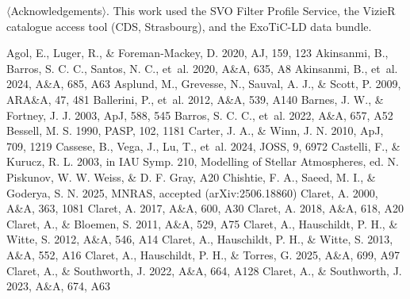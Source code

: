 \documentclass{aa}
\begin{document}
\begin{acknowledgements}
$\langle$Acknowledgements$\rangle$. This work used the SVO Filter Profile
Service, the VizieR catalogue access tool (CDS, Strasbourg), and the ExoTiC-LD
data bundle.
\end{acknowledgements}


\begin{thebibliography}{}
 Agol, E., Luger, R., \& Foreman-Mackey, D. 2020, AJ, 159, 123
 Akinsanmi, B., Barros, S. C. C., Santos, N. C., et~al. 2020, A\&A, 635, A8
 Akinsanmi, B., et~al. 2024, A\&A, 685, A63
 Asplund, M., Grevesse, N., Sauval, A. J., \& Scott, P. 2009, ARA\&A, 47, 481
 Ballerini, P., et~al. 2012, A\&A, 539, A140
 Barnes, J. W., \& Fortney, J. J. 2003, ApJ, 588, 545
 Barros, S. C. C., et~al. 2022, A\&A, 657, A52
 Bessell, M. S. 1990, PASP, 102, 1181
 Carter, J. A., \& Winn, J. N. 2010, ApJ, 709, 1219
 Cassese, B., Vega, J., Lu, T., et~al. 2024, JOSS, 9, 6972
 Castelli, F., \& Kurucz, R. L. 2003, in IAU Symp. 210, Modelling of Stellar Atmospheres, ed. N. Piskunov, W. W. Weiss, \& D. F. Gray, A20
 Chishtie, F. A., Saeed, M. I., \& Goderya, S. N. 2025, MNRAS, accepted (arXiv:2506.18860)
 Claret, A. 2000, A\&A, 363, 1081
 Claret, A. 2017, A\&A, 600, A30
 Claret, A. 2018, A\&A, 618, A20
 Claret, A., \& Bloemen, S. 2011, A\&A, 529, A75
 Claret, A., Hauschildt, P. H., \& Witte, S. 2012, A\&A, 546, A14
 Claret, A., Hauschildt, P. H., \& Witte, S. 2013, A\&A, 552, A16
 Claret, A., Hauschildt, P. H., \& Torres, G. 2025, A\&A, 699, A97
 Claret, A., \& Southworth, J. 2022, A\&A, 664, A128
 Claret, A., \& Southworth, J. 2023, A\&A, 674, A63

\end{thebibliography}
\end{document}
